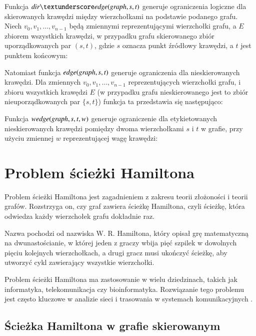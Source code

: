 Funkcja $\diredge$ generuje ograniczenia logiczne dla skierowanych krawędzi między wierzchołkami na podstawie podanego grafu. Niech $v_0, v_1, …, v_{n-1}$ będą zmiennymi reprezentującymi wierzchołki grafu, a \(E\) zbiorem wszystkich krawędzi, w przypadku grafu skierowanego zbiór uporządkowanych par $(s, t)$, gdzie \(s\) oznacza punkt źródłowy krawędzi, a \(t\) jest punktem końcowym:


\vspace{0.5cm}

Natomiast funkcja ${\mathit{edge(graph, s, t)}}$ generuje ograniczenia dla nieskierowanych krawędzi. Dla zmiennych $v_0, v_1, …, v_{n-1}$ reprezentujących wierzchołki grafu, i zbioru wszystkich krawędzi \(E\) (w przypadku grafu nieskierowanego jest to zbiór nieuporządkowanych par $\{s, t\}$) funkcja ta przedstawia się następująco:


\vspace{0.5cm}

Funkcja ${\mathit{wedge(graph, s, t, w)}}$ generuje ograniczenie dla etykietowanych nieskierowanych krawędzi pomiędzy dwoma wierzchołkami \(s\) i \(t\) w grafie, przy użyciu zmiennej \(w\) reprezentującej wagę krawędzi:



\section{Problem ścieżki Hamiltona}

Problem ścieżki Hamiltona jest zagadnieniem z zakresu teorii złożoności i teorii grafów. Rozstrzyga on, czy graf zawiera ścieżkę Hamiltona, czyli ścieżkę, która odwiedza każdy wierzchołek grafu dokładnie raz.

Nazwa pochodzi od nazwiska W. R. Hamiltona, który opisał grę matematyczną na dwunastościanie, w której jeden z graczy wbija pięć szpilek w dowolnych pięciu kolejnych wierzchołkach, a drugi gracz musi ukończyć ścieżkę, aby utworzyć cykl zawierający wszystkie wierzchołki.

Problem ścieżki Hamiltona ma zastosowanie w wielu dziedzinach, takich jak informatyka, telekomunikacja czy bioinformatyka. Rozwiązanie tego problemu jest często kluczowe w analizie sieci i trasowania w systemach komunikacyjnych \cite{enwiki:1190136070}.

\subsection{Ścieżka Hamiltona w grafie skierowanym}

